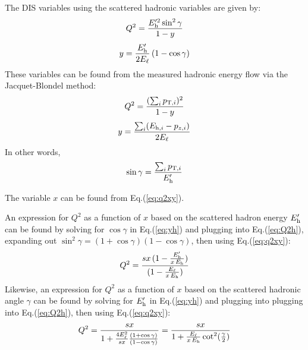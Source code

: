 \documentclass[12pt]{article}
\begin{document}
The DIS variables using the scattered hadronic variables are given by:
%
\begin{equation}
Q^2 = {E^{\prime 2}_{\rm h} \sin^2\gamma \over 1-y}
\label{eq:Q2h}
\end{equation}
\begin{equation}
y = {E^\prime_{\rm h} \over 2 E_\ell} \, (1-\cos\gamma)
\label{eq:yh}
\end{equation}
%
These variables
can be found from the measured hadronic energy flow via the Jacquet-Blondel
method:
%
\begin{equation}
Q^2 = {(\sum_i p_{{\rm T},i})^2 \over 1-y}
  \label{eq:jbmethq}
\end{equation}
\begin{equation}
y = {\sum_i (E_{{\rm h},i}-p_{z,i}) \over 2 E_\ell}
  \label{eq:jbmethy}
\end{equation}
%
In other words,
%
\begin{equation}
  \sin\gamma = {\sum_i p_{{\rm T},i} \over E^\prime_{\rm h}}
  \end{equation} 
%

The variable $x$ can be found from Eq.(\ref{eq:q2xy}). 

An expression for $Q^2$ as a function of $x$ based on the scattered
hadron energy $E^\prime_{\rm h}$ can be found by solving for $\cos\gamma$
in Eq.(\ref{eq:yh}) and plugging into Eq.(\ref{eq:Q2h}), expanding out
$\sin^2\gamma = (1+\cos\gamma)(1-\cos\gamma)$,
then using
Eq.(\ref{eq:q2xy}):
%
\begin{equation}
  Q^2 = {sx\,(1-{E^\prime_{\rm h} \over x\,E_{\rm h}}) \over 
      (1-{E_\ell \over x\,E_{\rm h}})}
\label{eq:q2hp}
\end{equation}
%
Likewise, an expression for $Q^2$ as a function of $x$ based on the
scattered hadronic angle $\gamma$ can be found by solving for $E^\prime_{\rm h}$ in
Eq.(\ref{eq:yh}) and plugging into plugging into Eq.(\ref{eq:Q2h}), then using
Eq.(\ref{eq:q2xy}):
%
\begin{equation}
Q^2 = {sx \over {1 + {4E^2_\ell \over sx} }{(1+\cos\gamma)
    \over (1-\cos\gamma) } } = {sx \over {1 + {E_\ell \over x\, E_{\rm h}} \cot^2({\gamma \over 2}) } }
\label{eq:q2hgamma}
\end{equation}
\end{document}
